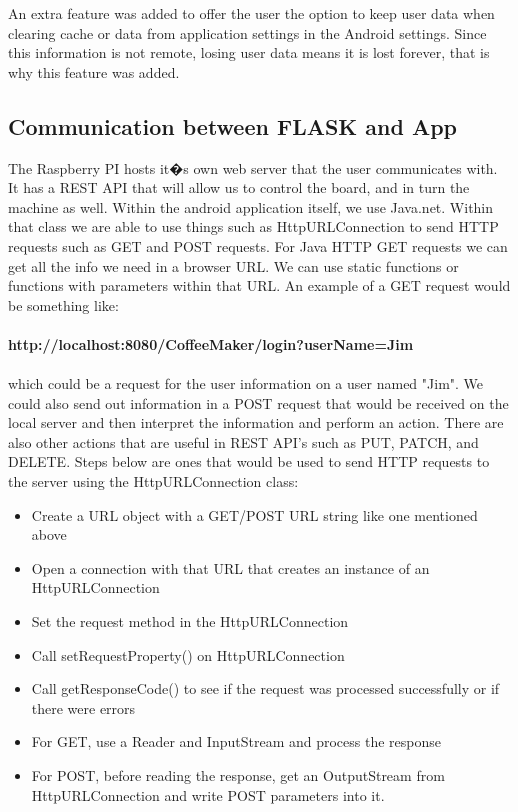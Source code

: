 \documentclass[conference]{IEEEtran}
\begin{document}
An extra feature was added to offer the user the option to
keep user data when clearing cache or data from application
settings in the Android settings. Since this information is not
remote, losing user data means it is lost forever, that is why
this feature was added.

\subsection{Communication between FLASK and App}
The Raspberry PI hosts it�s own web server that the
user communicates with. It has a REST API that will
allow us to control the board, and in turn the machine
as well. Within the android application itself, we use
Java.net. Within that class we are able to use things such
as HttpURLConnection to send HTTP requests such as
GET and POST requests. For Java HTTP GET requests we
can get all the info we need in a browser URL. We can
use static functions or functions with parameters within that
URL. An example of a GET request would be something like: \\ \\
\textbf{http://localhost:8080/CoffeeMaker/login?userName=Jim}\\ \\which could
be a request for the user information on a user named "Jim". We could also send
out information in a POST request that would be received on the local server
and then interpret the information and perform an action. There are also other
actions that are useful in REST API's such as PUT, PATCH, and DELETE. Steps
below are ones that would be used to send HTTP requests to the server using the
HttpURLConnection class:
\begin{itemize}
\item Create a URL object with a GET/POST URL string like one mentioned above
\item Open a connection with that URL that creates an instance of an HttpURLConnection
\item Set the request method in the HttpURLConnection
\item Call setRequestProperty() on HttpURLConnection
\item Call getResponseCode() to see if the request was processed successfully or
if there were errors
\item For GET, use a Reader and InputStream and process the response
\item For POST, before reading the response, get an OutputStream from
HttpURLConnection and write POST parameters into it.
\end{itemize} 
\ \\
\end{document}
